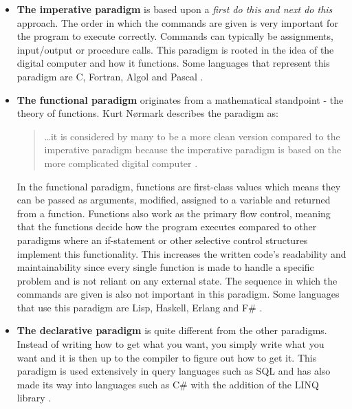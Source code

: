 \begin{itemize}
    \item \textbf{The imperative paradigm} is based upon a \textit{first do this and next do this} approach. The order in which the commands are given is very important for the program to execute correctly. Commands can typically be assignments, input/output or procedure calls. This paradigm is rooted in the idea of the digital computer and how it functions. Some languages that represent this paradigm are C, Fortran, Algol and Pascal
    \cite{ProgrammingParadigmsDefinition}
    \cite{ProgrammingParadigmsKurtNormark}.
    
    \item \textbf{The functional paradigm} originates from a mathematical standpoint - the theory of functions. Kurt Nørmark describes the paradigm as: 
    \begin{quote}
        \dots it is considered by many to be a more clean version compared to the imperative paradigm because the imperative paradigm is based on the more complicated digital computer \cite{ProgrammingParadigmsKurtNormark}.
    \end{quote}
    In the functional paradigm, functions are first-class values which means they can be passed as arguments, modified, assigned to a variable and returned from a function. 
    Functions also work as the primary flow control, meaning that the functions decide how the program executes compared to other paradigms where an if-statement or other selective control structures implement this functionality. 
    This increases the written code's readability and maintainability since every single function is made to handle a specific problem and is not reliant on any external state. 
    The sequence in which the commands are given is also not important in this paradigm. 
    Some languages that use this paradigm are Lisp, Haskell, Erlang and F\# \cite{ProgrammingParadigmsDefinition} \cite{FunctionProgrammingVsImperativeProgramming}.
    
    \item \textbf{The declarative paradigm} is quite different from the other paradigms. 
    Instead of writing how to get what you want, you simply write what you want and it is then up to the compiler to figure out how to get it. 
    This paradigm is used extensively in query languages such as SQL and has also made its way into languages such as C\# with the addition of the LINQ library \cite{ProgrammingParadigmsDefinition} \cite{ProgrammingParadigmsForDummies}. 
    

\end{itemize}
